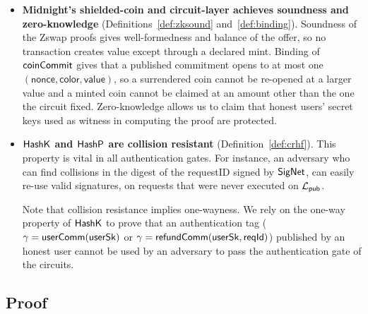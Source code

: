 \begin{itemize}
    \item \textbf{Midnight's shielded-coin  and circuit-layer  achieves soundness and  zero-knowledge}
    (Definitions~\ref{def:zksound} and~\ref{def:binding}). Soundness of the Zswap proofs gives
    well-formedness and balance of the offer, so no transaction creates value except through a
    declared mint. Binding of $\mathsf{coinCommit}$ gives that a published commitment opens to at most
    one $(\mathsf{nonce}, \mathsf{color}, \mathsf{value})$, so a surrendered coin cannot be
    re-opened at a larger value and a minted coin cannot be claimed at an amount other than the
    one the circuit fixed. Zero-knowledge  allows us to claim that honest users' secret keys
    used as witness in computing the proof are protected.



    \item \textbf{$\mathsf{HashK}$ and $\mathsf{HashP}$  are collision resistant}
    (Definition~\ref{def:crhf}).
    This property is vital in all authentication gates.
    For instance, an adversary who can find collisions in the digest of the requestID signed by $\mathsf{SigNet}$, can easily re-use valid signatures, on requests that were never executed on $\mathcal{L}_{\mathsf{pub}}$.

Note that collision resistance implies one-wayness. We rely on the one-way property of $\mathsf{HashK}$ to prove that an authentication tag ($\gamma=\mathsf{userComm}(\mathsf{userSk})$ or $\gamma=\mathsf{refundComm}(\mathsf{userSk},\mathsf{reqId})$) published by an honest user cannot be used by an adversary to pass the authentication gate of the  circuits.

\end{itemize}

\subsection{Proof}
\label{sound:proof}

